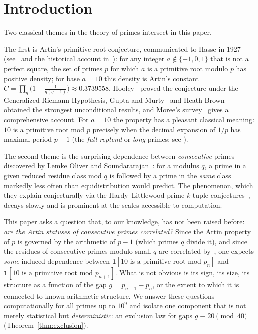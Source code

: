 \documentclass[11pt]{amsart}
\theoremstyle{definition}
\begin{document}
\maketitle

\section{Introduction}
\label{sec:intro}

Two classical themes in the theory of primes intersect in this paper.

The first is Artin's primitive root conjecture, communicated to Hasse in 1927
(see~\cite{Artin1965} and the historical account in~\cite{Moree2012}): for any integer
$a \notin \{-1, 0, 1\}$ that is not a perfect square, the set of primes $p$ for
which $a$ is a primitive root modulo $p$ has positive density; for base
$a = 10$ this density is Artin's constant
$C = \prod_q \bigl(1 - \tfrac{1}{q(q-1)}\bigr) \approx 0.3739558$.
Hooley~\cite{Hooley1967} proved the conjecture under the Generalized Riemann
Hypothesis, Gupta and Murty~\cite{GuptaMurty1984} and
Heath-Brown~\cite{HeathBrown1986} obtained the strongest unconditional
results, and Moree's survey~\cite{Moree2012} gives a comprehensive account.
For $a = 10$ the property has a pleasant classical meaning: $10$ is a primitive
root mod $p$ precisely when the decimal expansion of $1/p$ has maximal period
$p - 1$ (the \emph{full reptend} or \emph{long} primes; see
\cite[pp.~166--171]{ConwayGuy1996}).

The second theme is the surprising dependence between \emph{consecutive}
primes discovered by Lemke Oliver and Soundararajan~\cite{LOS2016}: for a
modulus $q$, a prime in a given reduced residue class mod $q$ is followed by a
prime in the \emph{same} class markedly less often than equidistribution would
predict. The phenomenon, which they explain conjecturally via the
Hardy--Littlewood prime $k$-tuple conjectures~\cite{HardyLittlewood1923}, decays
slowly and is prominent at the scales accessible to computation.

This paper asks a question that, to our knowledge, has not been raised before:
\emph{are the Artin statuses of consecutive primes correlated?} Since the
Artin property of $p$ is governed by the arithmetic of $p - 1$ (which primes
$q$ divide it), and since the residues of consecutive primes modulo small $q$
are correlated by~\cite{LOS2016}, one expects \emph{some} induced dependence
between $\mathbf{1}[10 \text{ is a primitive root mod } p_n]$ and
$\mathbf{1}[10 \text{ is a primitive root mod } p_{n+1}]$. What is not obvious
is its sign, its size, its structure as a function of the gap
$g = p_{n+1} - p_n$, or the extent to which it is connected to known
arithmetic structure. We answer these questions computationally for all primes up to
$10^9$ and isolate one component that is not merely statistical but
\emph{deterministic}: an exclusion law for gaps $g \equiv 20 \pmod{40}$
(Theorem~\ref{thm:exclusion}).
\end{document}
